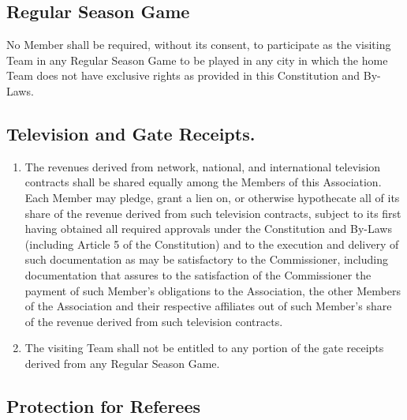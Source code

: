 \documentclass[]{book}
\providecommand{\tightlist}{%
  \setlength{\itemsep}{0pt}\setlength{\parskip}{0pt}}
\begin{document}
\hypertarget{regular-season-game}{%
\subsection{Regular Season Game}\label{regular-season-game}}

No Member shall be required, without its consent, to participate as the visiting Team in any Regular Season Game to be played in any city in which the home Team does not have exclusive rights as provided in this Constitution and By-Laws.

\hypertarget{television-and-gate-receipts.}{%
\subsection{Television and Gate Receipts.}\label{television-and-gate-receipts.}}

\begin{enumerate}
\def\labelenumi{(\alph{enumi})}
\tightlist
\item
  The revenues derived from network, national, and international television contracts shall be shared equally among the Members of this Association. Each Member may pledge, grant a lien on, or otherwise hypothecate all of its share of the revenue derived from such television contracts, subject to its first having obtained all required approvals under the Constitution and By-Laws (including Article 5 of the Constitution) and to the execution and delivery of such documentation as may be satisfactory to the Commissioner, including documentation that assures to the satisfaction of the Commissioner the payment of such Member's obligations to the Association, the other Members of the Association and their respective affiliates out of such Member's share of the revenue derived from such television contracts.
\item
  The visiting Team shall not be entitled to any portion of the gate receipts derived from any Regular Season Game.
\end{enumerate}

\hypertarget{protection-for-referees}{%
\subsection{Protection for Referees}\label{protection-for-referees}}
\end{document}
